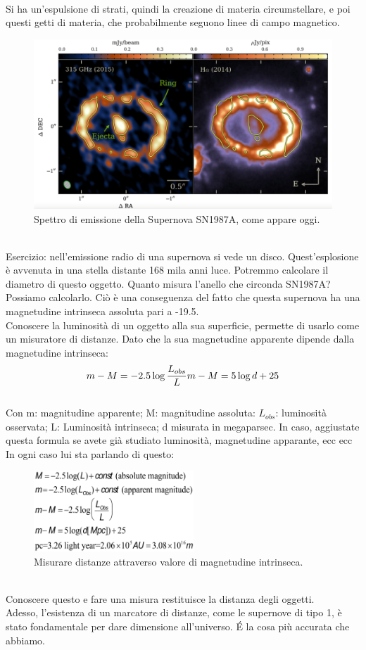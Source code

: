 \documentclass[a4paper,11pt]{article}
\begin{document}
    \\
Si ha un'espulsione di strati, quindi la creazione di materia circumstellare, e poi questi getti di materia, che probabilmente seguono linee di campo magnetico. 
\begin{figure}[h!!]
        \centering
        \includegraphics[width=12cm]{discosupernova.png}
        \caption{Spettro di emissione della Supernova SN1987A, come appare oggi.}
        \label{discosupernova.png}
    \end{figure}
    \\
Esercizio: nell'emissione radio di una supernova si vede un disco. Quest'esplosione è avvenuta in una stella distante 168 mila anni luce. Potremmo calcolare il diametro di questo oggetto. Quanto misura l'anello che circonda SN1987A? Possiamo calcolarlo. Ciò è una conseguenza del fatto che questa supernova ha una magnetudine intrinseca assoluta pari a -19.5. \\ Conoscere la luminosità di un oggetto alla sua superficie, permette di usarlo come un misuratore di distanze. Dato che la sua magnetudine apparente dipende dalla magnetudine intrinseca: 
$$
 m-M = -2.5 \log \frac{L_{obs}}{L} \\
 m - M = 5 \log d +25
$$
\\
Con m: magnitudine apparente; M: magnitudine assoluta: $L_{obs}$: luminosità osservata; L: Luminosità intrinseca; d misurata in megaparsec. In caso, aggiustate questa formula se avete già studiato luminosità, magnetudine apparante, ecc ecc\\ In ogni caso lui sta parlando di questo:
\begin{figure}[h!!]
        \centering
        \includegraphics[width=6cm]{lezione 28 novembre/misuradistanze.png}
        \caption{Misurare distanze attraverso valore di magnetudine intrinseca.}
        \label{lezione 28 novembre/misuradistanze.png}
    \end{figure} 
    \\
Conoscere questo e fare una misura restituisce la distanza degli oggetti. \\ Adesso, l'esistenza di un marcatore di distanze, come le supernove di tipo 1, è stato fondamentale per dare dimensione all'universo. \'E la cosa più accurata che abbiamo. \\
\newpage
\end{document}
